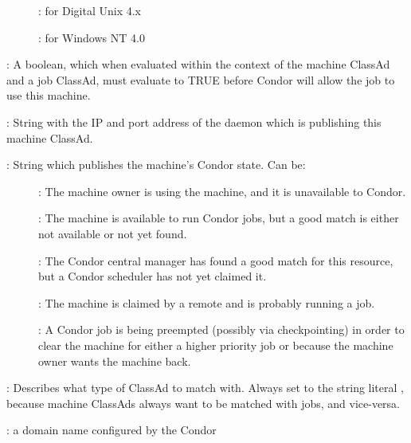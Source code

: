 \begin{description}
\begin{description}
	\item[] : for Digital Unix 4.x
	\item[]
	\item[]
	\item[]
	\item[]
	\item[] : for Windows NT 4.0
	\end{description}
%
\item[\AdAttr{Requirements}] : A boolean, which when evaluated within the context
of the machine ClassAd and a job ClassAd, must evaluate to
TRUE before Condor will allow the job to use this machine.
%
\item[\AdAttr{StartdIpAddr}] : String with the IP and port address of the
 daemon which is publishing this machine ClassAd.
%
\item[\AdAttr{State}] : String which publishes the machine's Condor state.
Can be:
	\begin{description}
	\item[] : The machine owner is using the machine, and
it is unavailable to Condor.
	\item[] : The machine is available to run Condor jobs,
but a good match is either not available or not 
yet found.
	\item[] : The Condor central manager has found a good
match for this resource, but a Condor scheduler has not yet claimed it.
	\item[] : The machine is claimed by a remote
 and is probably running a job.
	\item[] : A Condor job is being preempted (possibly
via checkpointing) in order to clear the machine for either a higher
priority job or because the machine owner wants the machine back.
	\end{description}   %
%
\item[\AdAttr{TargetType}] : Describes what type of ClassAd to match with.
Always set to the string literal , because machine ClassAds
always want to be matched with jobs, and vice-versa.
%
\item[\AdAttr{UidDomain}] : a domain name configured by the Condor 

\end{description}
